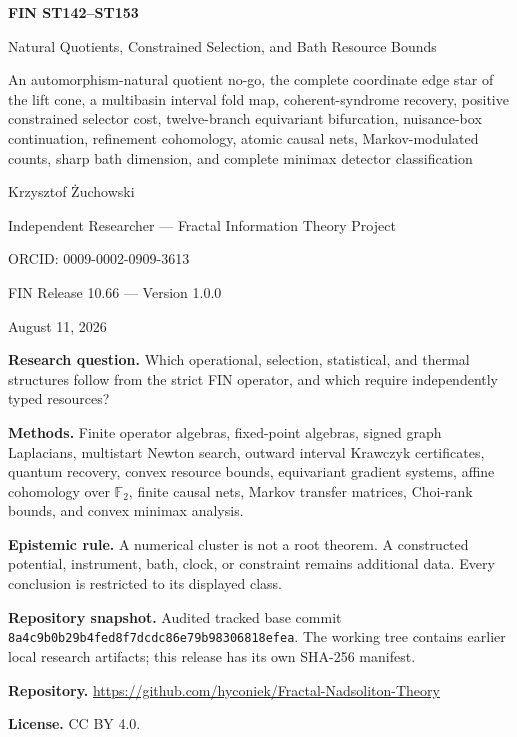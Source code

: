 \documentclass[11pt,a4paper]{article}
\begin{document}
\begin{titlepage}
\centering
\vspace*{0.85cm}
{\LARGE\bfseries FIN ST142--ST153\par}
\vspace{0.28cm}
{\Large Natural Quotients, Constrained Selection, and Bath Resource Bounds\par}
\vspace{0.40cm}
{\large An automorphism-natural quotient no-go, the complete coordinate edge star of the lift cone, a multibasin interval fold map, coherent-syndrome recovery, positive constrained selector cost, twelve-branch equivariant bifurcation, nuisance-box continuation, refinement cohomology, atomic causal nets, Markov-modulated counts, sharp bath dimension, and complete minimax detector classification\par}
\vspace{0.75cm}
{\Large Krzysztof \.{Z}uchowski\par}
\vspace{0.18cm}
{\large Independent Researcher --- Fractal Information Theory Project\par}
{\large ORCID: 0009-0002-0909-3613\par}
\vspace{0.55cm}
{\large FIN Release 10.66 --- Version 1.0.0\par}
{\large August 11, 2026\par}
\vfill
\begin{minipage}{0.92\textwidth}
\textbf{Research question.} Which operational, selection, statistical, and thermal structures follow from the strict FIN operator, and which require independently typed resources?\par
\textbf{Methods.} Finite operator algebras, fixed-point algebras, signed graph Laplacians, multistart Newton search, outward interval Krawczyk certificates, quantum recovery, convex resource bounds, equivariant gradient systems, affine cohomology over $\mathbb F_2$, finite causal nets, Markov transfer matrices, Choi-rank bounds, and convex minimax analysis.\par
\textbf{Epistemic rule.} A numerical cluster is not a root theorem. A constructed potential, instrument, bath, clock, or constraint remains additional data. Every conclusion is restricted to its displayed class.\par
\textbf{Repository snapshot.} Audited tracked base commit \texttt{8a4c9b0b29b4fed8f7dcdc86e79b98306818efea}. The working tree contains earlier local research artifacts; this release has its own SHA-256 manifest.\par
\textbf{Repository.} \url{https://github.com/hyconiek/Fractal-Nadsoliton-Theory}\par
\textbf{License.} CC BY 4.0.
\end{minipage}
\end{titlepage}
\end{document}
